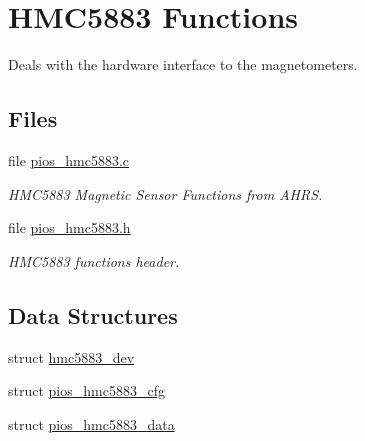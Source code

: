 \hypertarget{group___p_i_o_s___h_m_c5883}{\section{H\-M\-C5883 Functions}
\label{group___p_i_o_s___h_m_c5883}
}


Deals with the hardware interface to the magnetometers.  


\subsection*{Files}
\begin{DoxyCompactItemize}
\item 
file \hyperlink{pios__hmc5883_8c}{pios\-\_\-hmc5883.\-c}
\begin{DoxyCompactList}\small\item\em H\-M\-C5883 Magnetic Sensor Functions from A\-H\-R\-S. \end{DoxyCompactList}\item 
file \hyperlink{pios__hmc5883_8h}{pios\-\_\-hmc5883.\-h}
\begin{DoxyCompactList}\small\item\em H\-M\-C5883 functions header. \end{DoxyCompactList}\end{DoxyCompactItemize}
\subsection*{Data Structures}
\begin{DoxyCompactItemize}
\item 
struct \hyperlink{structhmc5883__dev}{hmc5883\-\_\-dev}
\item 
struct \hyperlink{structpios__hmc5883__cfg}{pios\-\_\-hmc5883\-\_\-cfg}
\item 
struct \hyperlink{structpios__hmc5883__data}{pios\-\_\-hmc5883\-\_\-data}
\end{DoxyCompactItemize}

